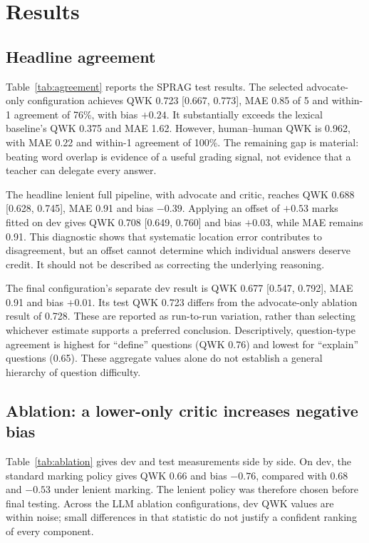 \section{Results}
\label{sec:results}
\subsection{Headline agreement}
Table~\ref{tab:agreement} reports the SPRAG test results. The selected advocate-only configuration achieves QWK 0.723 [0.667, 0.773], MAE 0.85 of 5 and within-1 agreement of 76\%, with bias $+0.24$. It substantially exceeds the lexical baseline's QWK 0.375 and MAE 1.62. However, human--human QWK is 0.962, with MAE 0.22 and within-1 agreement of 100\%. The remaining gap is material: beating word overlap is evidence of a useful grading signal, not evidence that a teacher can delegate every answer.

\begin{table}[htbp]
\centering
\caption{SPRAG test ($n=455$). Final-config intervals cluster by question; full-pipeline intervals are item-level. Dashes denote unreported values.}
\label{tab:agreement}
\end{table}

The headline lenient full pipeline, with advocate and critic, reaches QWK 0.688 [0.628, 0.745], MAE 0.91 and bias $-0.39$. Applying an offset of $+0.53$ marks fitted on dev gives QWK 0.708 [0.649, 0.760] and bias $+0.03$, while MAE remains 0.91. This diagnostic shows that systematic location error contributes to disagreement, but an offset cannot determine which individual answers deserve credit. It should not be described as correcting the underlying reasoning.

The final configuration's separate dev result is QWK 0.677 [0.547, 0.792], MAE 0.91 and bias $+0.01$. Its test QWK 0.723 differs from the advocate-only ablation result of 0.728. These are reported as run-to-run variation, rather than selecting whichever estimate supports a preferred conclusion. Descriptively, question-type agreement is highest for ``define'' questions (QWK 0.76) and lowest for ``explain'' questions (0.65). These aggregate values alone do not establish a general hierarchy of question difficulty.

\subsection{Ablation: a lower-only critic increases negative bias}
Table~\ref{tab:ablation} gives dev and test measurements side by side. On dev, the standard marking policy gives QWK 0.66 and bias $-0.76$, compared with 0.68 and $-0.53$ under lenient marking. The lenient policy was therefore chosen before final testing. Across the LLM ablation configurations, dev QWK values are within noise; small differences in that statistic do not justify a confident ranking of every component.

